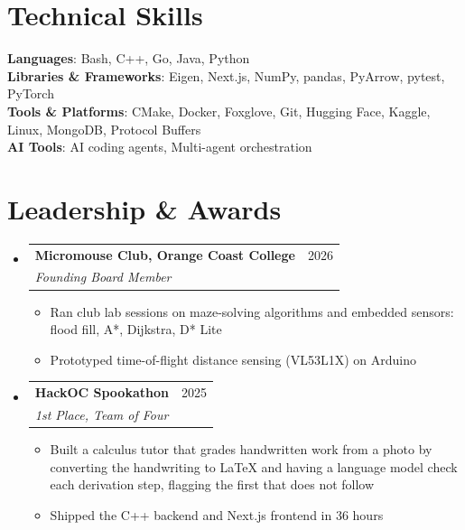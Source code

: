 \documentclass[letterpaper,11pt]{article}
\makeatletter
\newcommand{\resumeItem}[1]{
  \item\small{
    {#1 \vspace{-2pt}}
  }
}
\newcommand{\resumeSubheading}[4]{
  \vspace{-2pt}\item
    \begin{tabular*}{\linewidth}[t]{l@{\extracolsep{\fill}}r}
      \textbf{#1} & #2 \\
      \textit{\small#3} & \textit{\small #4} \\
    \end{tabular*}\vspace{-7pt}
}
\newcommand{\resumeSubHeadingListStart}{\begin{itemize}[leftmargin=0.15in, label={}]}
\newcommand{\resumeSubHeadingListEnd}{\end{itemize}}
\newcommand{\resumeItemListStart}{\begin{itemize}}
\newcommand{\resumeItemListEnd}{\end{itemize}\vspace{-5pt}}
\makeatother
\begin{document}
\section{Technical Skills}
 \begin{itemize}[leftmargin=0.15in, label={}]
    \small{\item{
     \textbf{Languages}{: Bash, C++, Go, Java, Python} \\
     \textbf{Libraries \& Frameworks}{: Eigen, Next.js, NumPy, pandas, PyArrow, pytest, PyTorch} \\
     \textbf{Tools \& Platforms}{: CMake, Docker, Foxglove, Git, Hugging Face, Kaggle, Linux, MongoDB, Protocol Buffers} \\
     \textbf{AI Tools}{: AI coding agents, Multi-agent orchestration}
    }\vspace{-6pt}}
 \end{itemize}

\section{Leadership \& Awards}
  \resumeSubHeadingListStart
    \resumeSubheading
      {Micromouse Club, Orange Coast College}{2026}
      {Founding Board Member}{}
      \resumeItemListStart
        \resumeItem{Ran club lab sessions on maze-solving algorithms and embedded sensors: flood fill, A*, Dijkstra, D* Lite}
        \resumeItem{Prototyped time-of-flight distance sensing (VL53L1X) on Arduino}
      \resumeItemListEnd
    \resumeSubheading
      {HackOC Spookathon}{2025}
      {1st Place, Team of Four}{}
      \resumeItemListStart
        \resumeItem{Built a calculus tutor that grades handwritten work from a photo by converting the handwriting to LaTeX and having a language model check each derivation step, flagging the first that does not follow}
        \resumeItem{Shipped the C++ backend and Next.js frontend in 36 hours}
      \resumeItemListEnd
  \resumeSubHeadingListEnd
\end{document}

